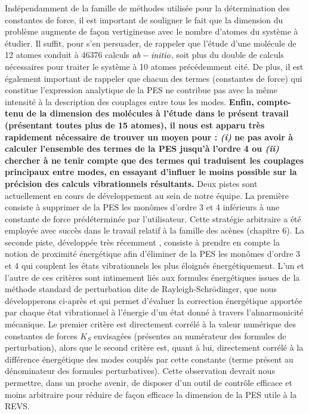 Indépendamment de la famille de méthodes utilisée pour la détermination des constantes de force, il est important de souligner le fait que la dimension du problème augmente de façon vertigineuse avec le nombre d’atomes du système à étudier. Il suffit, pour s’en persuader, de rappeler que l’étude d’une molécule de 12 atomes conduit à 46376 calculs $\it{ab-initio}$, soit plus du double de calculs nécessaires pour traiter le système à 10 atomes précédemment cité. De plus, il est également important de rappeler que chacun des termes (constantes de force) qui constitue l’expression analytique de la PES ne contribue pas avec la même intensité à la description des couplages entre tous les modes. \textbf{Enfin, compte-tenu de la dimension des molécules à l'étude dans le présent travail (présentant toutes plus de 15 atomes), il nous est apparu très rapidement nécessaire de trouver un moyen pour : \textit{(i)} ne pas avoir à calculer l’ensemble des termes de la PES jusqu’à l’ordre 4 ou \textit{(ii)} chercher à ne tenir compte que des termes qui traduisent les couplages principaux entre modes, en essayant d’influer le moins possible sur la précision des calculs vibrationnels résultants.} 
Deux pistes sont actuellement en cours de développement au sein de  notre équipe. La première consiste à supprimer de la PES les monômes d’ordre 3 et 4 inférieurs à une constante de force prédéterminée par l’utilisateur. Cette stratégie \og arbitraire \fg{} a été employée avec succès dans le travail relatif à la famille des acènes \cite{spillebout2014discerning} (chapitre 6). La seconde piste, développée très récemment \cite{fradet2016}, consiste à prendre en compte la notion de \og proximité énergétique \fg{} afin d’éliminer de la PES les monômes d’ordre 3 et 4 qui couplent les états vibrationnels les plus éloignés énergétiquement. L’un et l’autre de ces critères sont intimement liés aux formules énergétiques issues de la méthode standard de perturbation dite de Rayleigh-Schrödinger, que nous développerons ci-après et qui permet d’évaluer la correction énergétique apportée par chaque état vibrationnel à l’énergie d’un état donné à travers l’ahnarmonicité mécanique. Le premier critère est directement corrélé à la valeur numérique des constantes de forces $K_{S}$ envisagées (présentes au numérateur des formules de perturbation), alors que le second critère est, quant à lui, directement corrélé à la différence énergétique des modes couplés par cette constante (terme présent au dénominateur des formules perturbatives). Cette observation devrait nous permettre, dans un proche avenir, de disposer d’un outil de contrôle efficace et moins \og arbitraire \fg{} pour réduire de façon efficace la dimension de la PES utile à la REVS. 






